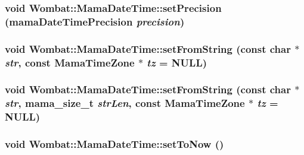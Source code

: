 \label{classWombat_1_1MamaDateTime_a1a4e876163aae99f96fa98162424895b}
\hypertarget{classWombat_1_1MamaDateTime_a5da515d920a7999066e8af43eff427ee}{
\subsubsection[{setPrecision}]{\setlength{\rightskip}{0pt plus 5cm}void Wombat::MamaDateTime::setPrecision (mamaDateTimePrecision {\em precision})}}
\label{classWombat_1_1MamaDateTime_a5da515d920a7999066e8af43eff427ee}
\hypertarget{classWombat_1_1MamaDateTime_a403d86b47924626e1674ebdd9e8d9bb2}{
\subsubsection[{setFromString}]{\setlength{\rightskip}{0pt plus 5cm}void Wombat::MamaDateTime::setFromString (const char $\ast$ {\em str}, \/  const {\bf MamaTimeZone} $\ast$ {\em tz} = {\ttfamily NULL})}}
\label{classWombat_1_1MamaDateTime_a403d86b47924626e1674ebdd9e8d9bb2}
\hypertarget{classWombat_1_1MamaDateTime_ab8b0370e32d78691526cb620bfc6971d}{
\subsubsection[{setFromString}]{\setlength{\rightskip}{0pt plus 5cm}void Wombat::MamaDateTime::setFromString (const char $\ast$ {\em str}, \/  {\bf mama\_\-size\_\-t} {\em strLen}, \/  const {\bf MamaTimeZone} $\ast$ {\em tz} = {\ttfamily NULL})}}
\label{classWombat_1_1MamaDateTime_ab8b0370e32d78691526cb620bfc6971d}
\hypertarget{classWombat_1_1MamaDateTime_a70ff9ced71b5f724cb83312f83414fef}{
\subsubsection[{setToNow}]{\setlength{\rightskip}{0pt plus 5cm}void Wombat::MamaDateTime::setToNow ()}}
\label{classWombat_1_1MamaDateTime_a70ff9ced71b5f724cb83312f83414fef}
